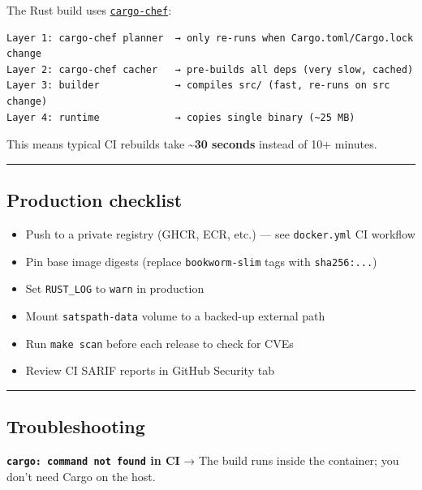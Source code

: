\documentclass[
]{article}
\providecommand{\tightlist}{%
  \setlength{\itemsep}{0pt}\setlength{\parskip}{0pt}}
\begin{document}
The Rust build uses
\href{https://github.com/LukeMathWalker/cargo-chef}{\texttt{cargo-chef}}:

\begin{verbatim}
Layer 1: cargo-chef planner  → only re-runs when Cargo.toml/Cargo.lock change
Layer 2: cargo-chef cacher   → pre-builds all deps (very slow, cached)
Layer 3: builder             → compiles src/ (fast, re-runs on src change)
Layer 4: runtime             → copies single binary (~25 MB)
\end{verbatim}

This means typical CI rebuilds take \textbf{\textasciitilde30 seconds}
instead of 10+ minutes.

\begin{center}\rule{0.5\linewidth}{0.5pt}\end{center}

\hypertarget{production-checklist}{%
\subsection{Production checklist}\label{production-checklist}}

\begin{itemize}
\tightlist
\item[$\square$]
  Push to a private registry (GHCR, ECR, etc.) --- see
  \texttt{docker.yml} CI workflow
\item[$\square$]
  Pin base image digests (replace \texttt{bookworm-slim} tags with
  \texttt{sha256:...})
\item[$\square$]
  Set \texttt{RUST\_LOG} to \texttt{warn} in production
\item[$\square$]
  Mount \texttt{satspath-data} volume to a backed-up external path
\item[$\square$]
  Run \texttt{make\ scan} before each release to check for CVEs
\item[$\square$]
  Review CI SARIF reports in GitHub Security tab
\end{itemize}

\begin{center}\rule{0.5\linewidth}{0.5pt}\end{center}

\hypertarget{troubleshooting}{%
\subsection{Troubleshooting}\label{troubleshooting}}

\textbf{\texttt{cargo:\ command\ not\ found} in CI} → The build runs
inside the container; you don't need Cargo on the host.
\end{document}
